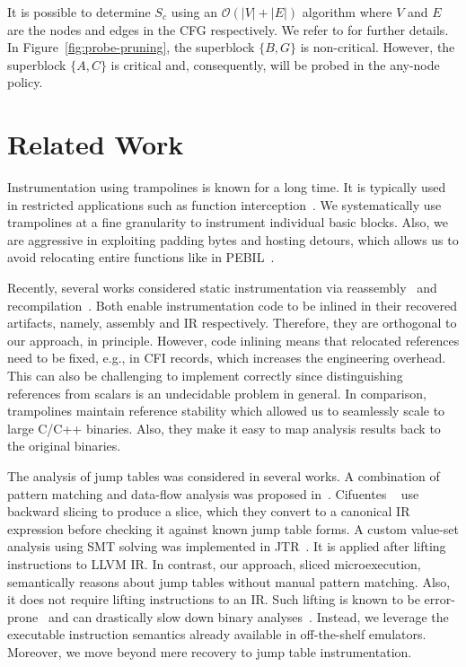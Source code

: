 {It is possible to determine $S_c$ using an $\mathcal{O}(|V|+|E|)$ algorithm where $V$ and $E$ are the nodes and edges in the CFG 
respectively.
We refer to \cite{Agrawal1994} for further details.
In Figure~\ref{fig:probe-pruning}, the superblock $\{B,G\}$ is non-critical. However, the superblock $\{A,C\}$ is critical and, consequently, will be probed in the any-node policy.


\section{Related Work}
\label{sec:related-work}

Instrumentation using trampolines is known for a long time.
It is typically used in restricted applications such as function interception~\cite{MicrosoftDetours}.
We systematically use trampolines at a fine granularity to instrument individual basic blocks.
Also, we are aggressive in exploiting padding bytes and hosting detours, which allows us to avoid relocating entire functions like in PEBIL~\cite{Laurenzano2010}.


Recently, several works considered static instrumentation via reassembly~\cite{Wang2015,RetroWriteSP2020} and recompilation~\cite{Anand:EuroSys2013}.
Both enable instrumentation code to be inlined in their recovered artifacts, namely, assembly and IR respectively. 
Therefore, they are orthogonal to our approach, in principle. 
However, code inlining means that relocated references need to be
fixed, e.g., in CFI records, which increases the engineering overhead. 
This can also be challenging to implement correctly since distinguishing references from scalars is an undecidable problem in general. 
In comparison, trampolines maintain reference stability which allowed us to seamlessly scale to large C/C++ binaries. 
Also, they make it easy to map analysis results back to the original binaries.

The analysis of jump tables was considered in several works.
A combination of pattern matching and data-flow analysis was proposed in~\cite{BenKhadra2016,Meng:ISSTA2016}. 
Cifuentes \etal~\cite{Cifuentes1999} use backward slicing to produce a slice, which they convert to a canonical IR expression before checking it against known jump table forms.
A custom value-set analysis using SMT solving was implemented in JTR~\cite{Cojocar2017a}.
It is applied after lifting instructions to LLVM IR.
In contrast, our approach, sliced microexecution, semantically reasons about jump tables without manual pattern matching. 
Also, it does not require lifting instructions to an IR. 
Such lifting is known to be error-prone~\cite{BinIR:ASE17} and can drastically slow down binary analyses~\cite{QSYMYun2018}.
Instead, we leverage the executable instruction semantics already available in off-the-shelf emulators.
Moreover, we move beyond mere recovery to jump table instrumentation.


}
